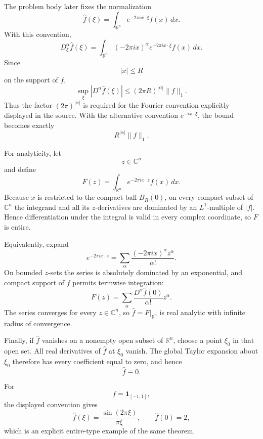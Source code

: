 \begin{solution}
The problem body later fixes the normalization
\[
\widehat f(\xi)
=
\int_{\mathbb R^n}
e^{-2\pi i x\cdot\xi}f(x)\,dx.
\]
With this convention,
\[
D_\xi^\alpha\widehat f(\xi)
=
\int_{\mathbb R^n}
(-2\pi i x)^\alpha
e^{-2\pi i x\cdot\xi}f(x)\,dx.
\]
Since
\[
|x|\le R
\]
on the support of \(f\),
\[
\boxed{
\sup_\xi
|D^\alpha\widehat f(\xi)|
\le
(2\pi R)^{|\alpha|}\|f\|_1.
}
\]
Thus the factor \((2\pi)^{|\alpha|}\) is required for the Fourier convention explicitly displayed in the source. With the alternative convention \(e^{-ix\cdot\xi}\), the bound becomes exactly
\[
R^{|\alpha|}\|f\|_1.
\]

For analyticity, let
\[
z\in\mathbb C^n
\]
and define
\[
F(z)
=
\int_{\mathbb R^n}
e^{-2\pi i x\cdot z}f(x)\,dx.
\]
Because \(x\) is restricted to the compact ball \(B_R(0)\), on every compact subset of \(\mathbb C^n\) the integrand and all its \(z\)-derivatives are dominated by an \(L^1\)-multiple of \(|f|\). Hence differentiation under the integral is valid in every complex coordinate, so \(F\) is entire.

Equivalently, expand
\[
e^{-2\pi i x\cdot z}
=
\sum_{\alpha}
\frac{(-2\pi i x)^\alpha z^\alpha}{\alpha!}.
\]
On bounded \(z\)-sets the series is absolutely dominated by an exponential, and compact support of \(f\) permits termwise integration:
\[
F(z)
=
\sum_\alpha
\frac{D^\alpha\widehat f(0)}{\alpha!}z^\alpha.
\]
The series converges for every \(z\in\mathbb C^n\), so \(\widehat f=F|_{\mathbb R^n}\) is real analytic with infinite radius of convergence.

Finally, if \(\widehat f\) vanishes on a nonempty open subset of \(\mathbb R^n\), choose a point \(\xi_0\) in that open set. All real derivatives of \(\widehat f\) at \(\xi_0\) vanish. The global Taylor expansion about \(\xi_0\) therefore has every coefficient equal to zero, and hence
\[
\boxed{\widehat f\equiv0.}
\]

For
\[
f=\mathbf1_{[-1,1]},
\]
the displayed convention gives
\[
\widehat f(\xi)
=
\frac{\sin(2\pi\xi)}{\pi\xi},
\qquad
\widehat f(0)=2,
\]
which is an explicit entire-type example of the same theorem.
\end{solution}


